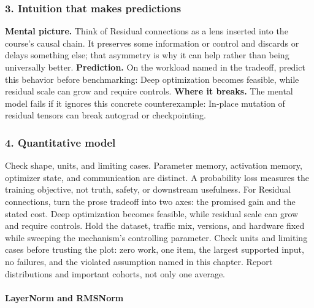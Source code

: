 \subsubsection*{3. Intuition that makes predictions}
\textbf{Mental picture.} Think of Residual connections as a lens inserted into the course's causal chain. It preserves some information or control and discards or delays something else; that asymmetry is why it can help rather than being universally better.
\textbf{Prediction.} On the workload named in the tradeoff, predict this behavior before benchmarking: Deep optimization becomes feasible, while residual scale can grow and require controls.
\textbf{Where it breaks.} The mental model fails if it ignores this concrete counterexample: In-place mutation of residual tensors can break autograd or checkpointing.
\subsubsection*{4. Quantitative model}
Check shape, units, and limiting cases. Parameter memory, activation memory, optimizer state, and communication are distinct. A probability loss measures the training objective, not truth, safety, or downstream usefulness.
For Residual connections, turn the prose tradeoff into two axes: the promised gain and the stated cost. Deep optimization becomes feasible, while residual scale can grow and require controls. Hold the dataset, traffic mix, versions, and hardware fixed while sweeping the mechanism's controlling parameter.
Check units and limiting cases before trusting the plot: zero work, one item, the largest supported input, no failures, and the violated assumption named in this chapter. Report distributions and important cohorts, not only one average.
\paragraph{LayerNorm and RMSNorm}
